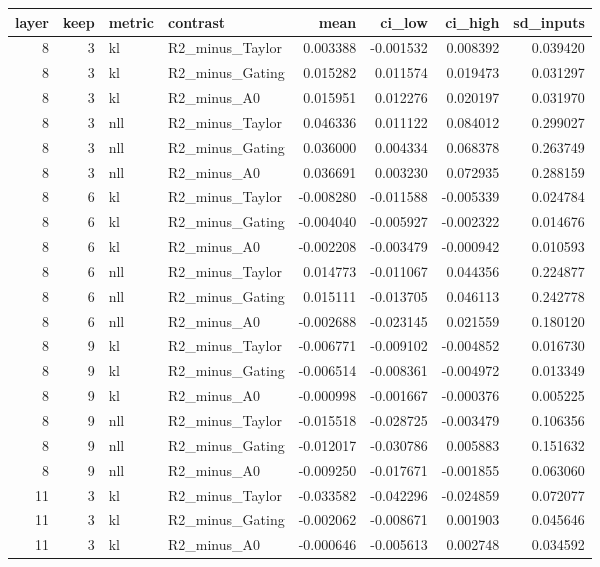 \begin{tabular}{rrllrrrr}
\toprule
layer & keep & metric & contrast & mean & ci_low & ci_high & sd_inputs \\
\midrule
8 & 3 & kl & R2_minus_Taylor & 0.003388 & -0.001532 & 0.008392 & 0.039420 \\
8 & 3 & kl & R2_minus_Gating & 0.015282 & 0.011574 & 0.019473 & 0.031297 \\
8 & 3 & kl & R2_minus_A0 & 0.015951 & 0.012276 & 0.020197 & 0.031970 \\
8 & 3 & nll & R2_minus_Taylor & 0.046336 & 0.011122 & 0.084012 & 0.299027 \\
8 & 3 & nll & R2_minus_Gating & 0.036000 & 0.004334 & 0.068378 & 0.263749 \\
8 & 3 & nll & R2_minus_A0 & 0.036691 & 0.003230 & 0.072935 & 0.288159 \\
8 & 6 & kl & R2_minus_Taylor & -0.008280 & -0.011588 & -0.005339 & 0.024784 \\
8 & 6 & kl & R2_minus_Gating & -0.004040 & -0.005927 & -0.002322 & 0.014676 \\
8 & 6 & kl & R2_minus_A0 & -0.002208 & -0.003479 & -0.000942 & 0.010593 \\
8 & 6 & nll & R2_minus_Taylor & 0.014773 & -0.011067 & 0.044356 & 0.224877 \\
8 & 6 & nll & R2_minus_Gating & 0.015111 & -0.013705 & 0.046113 & 0.242778 \\
8 & 6 & nll & R2_minus_A0 & -0.002688 & -0.023145 & 0.021559 & 0.180120 \\
8 & 9 & kl & R2_minus_Taylor & -0.006771 & -0.009102 & -0.004852 & 0.016730 \\
8 & 9 & kl & R2_minus_Gating & -0.006514 & -0.008361 & -0.004972 & 0.013349 \\
8 & 9 & kl & R2_minus_A0 & -0.000998 & -0.001667 & -0.000376 & 0.005225 \\
8 & 9 & nll & R2_minus_Taylor & -0.015518 & -0.028725 & -0.003479 & 0.106356 \\
8 & 9 & nll & R2_minus_Gating & -0.012017 & -0.030786 & 0.005883 & 0.151632 \\
8 & 9 & nll & R2_minus_A0 & -0.009250 & -0.017671 & -0.001855 & 0.063060 \\
11 & 3 & kl & R2_minus_Taylor & -0.033582 & -0.042296 & -0.024859 & 0.072077 \\
11 & 3 & kl & R2_minus_Gating & -0.002062 & -0.008671 & 0.001903 & 0.045646 \\
11 & 3 & kl & R2_minus_A0 & -0.000646 & -0.005613 & 0.002748 & 0.034592 \\

\end{tabular}
